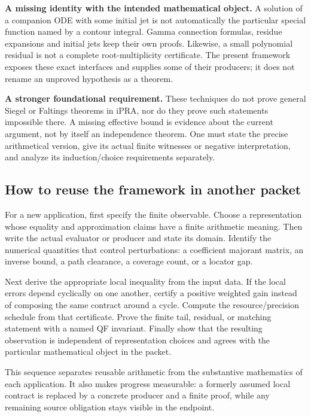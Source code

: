 \textbf{A missing identity with the intended mathematical object.} A solution of a companion ODE with some initial jet is not automatically the particular special function named by a contour integral. Gamma connection formulas, residue expansions and initial jets keep their own proofs. Likewise, a small polynomial residual is not a complete root-multiplicity certificate. The present framework exposes these exact interfaces and supplies some of their producers; it does not rename an unproved hypothesis as a theorem.

\textbf{A stronger foundational requirement.} These techniques do not prove general Siegel or Faltings theorems in iPRA, nor do they prove such statements impossible there. A missing effective bound is evidence about the current argument, not by itself an independence theorem. One must state the precise arithmetical version, give its actual finite witnesses or negative interpretation, and analyze its induction/choice requirements separately.

\subsection{How to reuse the framework in another packet}

For a new application, first specify the finite observable. Choose a representation whose equality and approximation claims have a finite arithmetic meaning. Then write the actual evaluator or producer and state its domain. Identify the numerical quantities that control perturbations: a coefficient majorant matrix, an inverse bound, a path clearance, a coverage count, or a locator gap.

Next derive the appropriate local inequality from the input data. If the local errors depend cyclically on one another, certify a positive weighted gain instead of composing the same contract around a cycle. Compute the resource/precision schedule from that certificate. Prove the finite tail, residual, or matching statement with a named QF invariant. Finally show that the resulting observation is independent of representation choices and agrees with the particular mathematical object in the packet.

This sequence separates reusable arithmetic from the substantive mathematics of each application. It also makes progress measurable: a formerly assumed local contract is replaced by a concrete producer and a finite proof, while any remaining source obligation stays visible in the endpoint.
